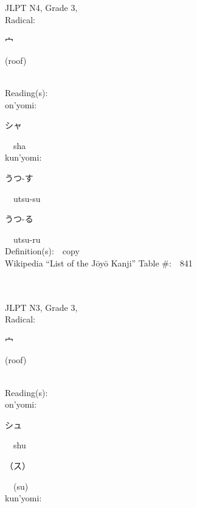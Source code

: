 \begin{multicols}{2}
{JLPT N4, Grade 3, \\Radical:\ \ {\begin{CJK}{UTF8}{min} 宀 \end{CJK}} (roof) } \\
Reading(s):\ \ \\
{\hspace*{1em}}on'yomi:\ \ \\
{\hspace*{2em}}{\begin{CJK}{UTF8}{min} シャ \end{CJK}}\ \ sha\ \ \\
{\hspace*{1em}}kun'yomi:\ \ \\
{\hspace*{2em}}{\begin{CJK}{UTF8}{min} うつ-す \end{CJK}}\ \ utsu-su\ \ \\
{\hspace*{2em}}{\begin{CJK}{UTF8}{min} うつ-る \end{CJK}}\ \ utsu-ru\ \ \\
Definition(s):\ \ copy \\
Wikipedia ``List of the J\=oy\=o Kanji'' Table \#:\ \ 841 \\
\ \ \\
{\fontsize{34pt}{40pt}  }\ \ \\  %
{JLPT N3, Grade 3, \\Radical:\ \ {\begin{CJK}{UTF8}{min} 宀 \end{CJK}} (roof) } \\
Reading(s):\ \ \\
{\hspace*{1em}}on'yomi:\ \ \\
{\hspace*{2em}}{\begin{CJK}{UTF8}{min} シュ \end{CJK}}\ \ shu\ \ \\
{\hspace*{2em}}{\begin{CJK}{UTF8}{min} （ス） \end{CJK}}\ \ (su)\ \ \\
{\hspace*{1em}}kun'yomi:\ \ \\

\end{multicols}
